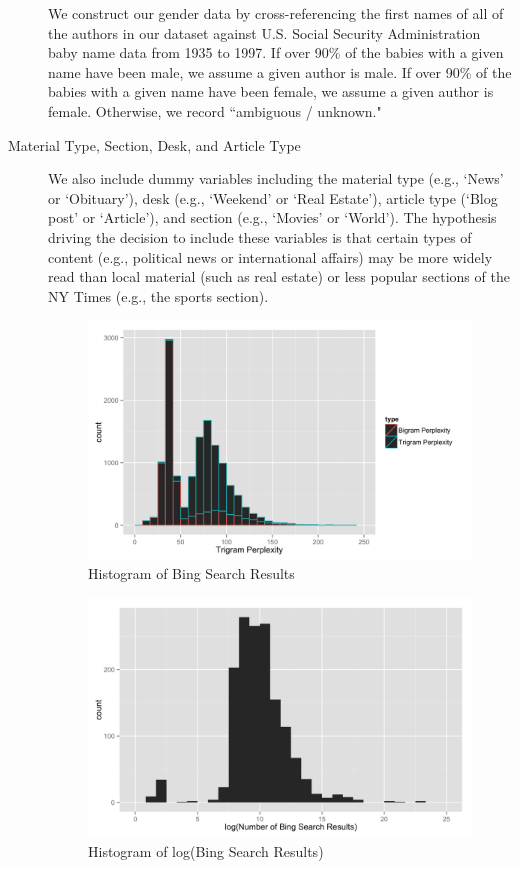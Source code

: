 \documentclass[fleqn,12pt]{SelfArx} %
\begin{document}
\begin{description}
	We construct our gender data by cross-referencing the first names of all of the authors in our dataset against U.S. Social Security Administration baby name data from 1935 to 1997. If over 90\% of the babies with a given name have been male, we assume a given author is male. If over 90\% of the babies with a given name have been female, we assume a given author is female. Otherwise, we record ``ambiguous / unknown."
	
	\item[Material Type, Section, Desk, and Article Type] We also include dummy variables including the material type (e.g., `News' or `Obituary'), desk (e.g., `Weekend' or `Real Estate'), article type (`Blog post' or `Article'), and section (e.g., `Movies' or `World'). The hypothesis driving the decision to include these variables is that certain types of content (e.g., political news or international affairs) may be more widely read than local material (such as real estate) or less popular sections of the NY Times (e.g., the sports section).

\begin{figure}[ht]\centering
\includegraphics[width=\linewidth]{author_popularity_histogram.png}
\caption{Histogram of Bing Search Results}
\label{fig:ap_hist}
\end{figure}

\begin{figure}[ht]\centering
\includegraphics[width=\linewidth]{author_popularity_log_histogram.png}
\caption{Histogram of log(Bing Search Results)}
\label{fig:apl_hist}
\end{figure}
	

\end{description}
\end{document}
